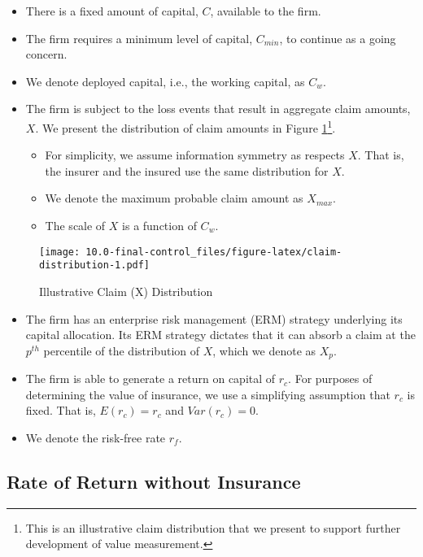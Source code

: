 \documentclass[
]{article}
\begin{document}
\begin{itemize}
\item
  There is a fixed amount of capital, \(C\), available to the firm.
\item
  The firm requires a minimum level of capital, \(C_{min}\), to continue
  as a going concern.
\item
  We denote deployed capital, i.e., the working capital, as \(C_w\).
\item
  The firm is subject to the loss events that result in aggregate claim
  amounts, \(X\). We present the distribution of claim amounts in Figure
  \ref{fig:clm-dist}\footnote{This is an illustrative claim distribution
    that we present to support further development of value measurement.}.

  \begin{itemize}
  \item
    For simplicity, we assume information symmetry as respects \(X\).
    That is, the insurer and the insured use the same distribution for
    \(X\).
  \item
    We denote the maximum probable claim amount as \(X_{max}\).
  \item
    The scale of \(X\) is a function of \(C_w\).
  \end{itemize}
\end{itemize}

\begin{figure}
\centering
\texttt{[image: 10.0-final-control\_files/figure-latex/claim-distribution-1.pdf]}
\caption{\label{fig:clm-dist}Illustrative Claim (X) Distribution}
\end{figure}

\begin{itemize}
\item
  The firm has an enterprise risk management (ERM) strategy underlying
  its capital allocation. Its ERM strategy dictates that it can absorb a
  claim at the \(p^{th}\) percentile of the distribution of \(X\), which
  we denote as \(X_p\).
\item
  The firm is able to generate a return on capital of \(r_c\). For
  purposes of determining the value of insurance, we use a simplifying
  assumption that \(r_c\) is fixed. That is, \(E(r_c)=r_c\) and
  \(Var(r_c)=0\).
\item
  We denote the risk-free rate \(r_f\).
\end{itemize}

\hypertarget{rate-of-return-without-insurance}{%
\subsection{Rate of Return without
Insurance}\label{rate-of-return-without-insurance}}
\end{document}
